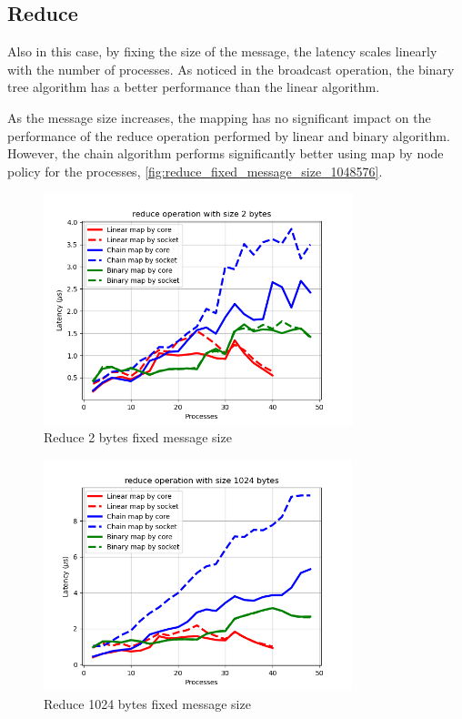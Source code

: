 \subsection{Reduce}

Also in this case, by fixing the size of the message, the latency scales linearly with the number of processes. As noticed in the broadcast operation, the binary tree algorithm has a better performance than the linear algorithm.

As the message size increases, the mapping has no significant impact on the performance of the reduce operation performed by linear and binary algorithm. However, the chain algorithm performs significantly better using map by node policy for the processes, \ref{fig:reduce_fixed_message_size_1048576}.


\begin{figure}[h!]
    \centering
    \includegraphics[width=0.8\textwidth]{../plots/reduce_fixedSize2.png}
    \caption{Reduce 2 bytes fixed message size}
    \label{fig:reduce_fixed_message_size_2}
\end{figure}

\begin{figure}[h!]
    \centering
    \includegraphics[width=0.8\textwidth]{../plots/reduce_fixedSize1024.png}
    \caption{Reduce 1024 bytes fixed message size}
    \label{fig:reduce_fixed_message_size_1024}
\end{figure}

